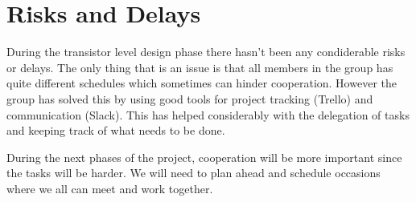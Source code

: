 \section{Risks and Delays} \label{sec:risks}
During the transistor level design phase there hasn't been any condiderable risks or delays. The only thing that is an issue is that all members in the group has quite different schedules which sometimes can hinder cooperation. However the group has solved this by using good tools for project tracking (Trello) and communication (Slack). This has helped considerably with the delegation of tasks and keeping track of what needs to be done. 

During the next phases of the project, cooperation will be more important since the tasks will be harder. We will need to plan ahead and schedule occasions where we all can meet and work together.
